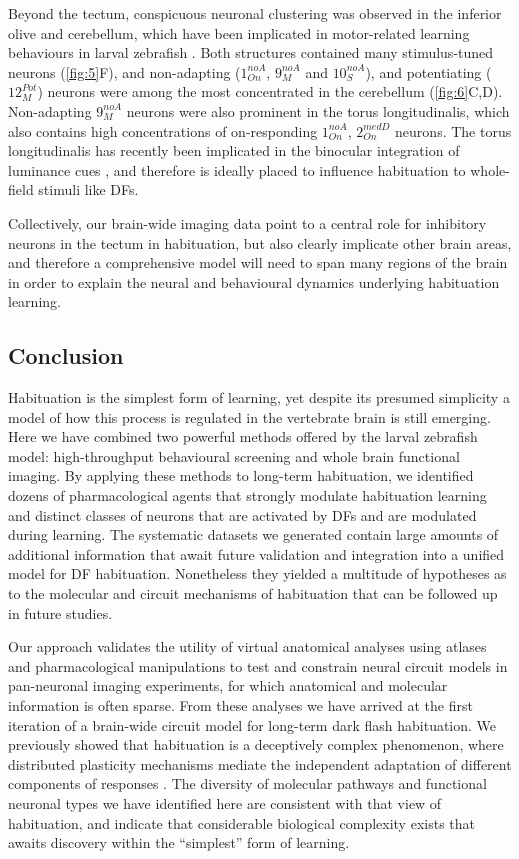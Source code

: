 \documentclass[9pt,lineno]{RandlettLab_elife}
\begin{document}
Beyond the tectum, conspicuous neuronal clustering was observed in the inferior olive and cerebellum, which have been implicated in motor-related learning behaviours in larval zebrafish \cite{Ahrens2012-zb, Lin2020-dv, Markov2021-rc}. Both structures contained many stimulus-tuned neurons (\autoref{fig:5}F), and non-adapting ($1_{On}^{noA}$,  $9_{M}^{noA}$ and $10_{S}^{noA}$), and potentiating ($12_{M}^{Pot}$) neurons were among the most concentrated in the cerebellum (\autoref{fig:6}C,D). Non-adapting $9_{M}^{noA}$ neurons were also prominent in the torus longitudinalis, which also contains high concentrations of on-responding $1_{On}^{noA}$, $2_{On}^{medD}$ neurons. The torus longitudinalis has recently been implicated in the binocular integration of luminance cues \cite{Tesmer2022-tk}, and therefore is ideally placed to influence habituation to whole-field stimuli like DFs. 

Collectively, our brain-wide imaging data point to a central role for inhibitory neurons in the tectum in habituation, but also clearly implicate other brain areas, and therefore a comprehensive model will need to span many regions of the brain in order to explain the neural and behavioural dynamics underlying habituation learning. 

\subsection{Conclusion}

Habituation is the simplest form of learning, yet despite its presumed simplicity a model of how this process is regulated in the vertebrate brain is still emerging. Here we have combined two powerful methods offered by the larval zebrafish model: high-throughput behavioural screening and whole brain functional imaging. By applying these methods to long-term habituation, we identified dozens of pharmacological agents that strongly modulate habituation learning and distinct classes of neurons that are activated by DFs and are modulated during learning. The systematic datasets we generated contain large amounts of additional information that await future validation and integration into a unified model for DF habituation. Nonetheless they yielded a multitude of hypotheses as to the molecular and circuit mechanisms of habituation that can be followed up in future studies. 

Our approach validates the utility of virtual anatomical analyses using atlases and pharmacological manipulations to test and constrain neural circuit models in pan-neuronal imaging experiments, for which anatomical and molecular information is often sparse. From these analyses we have arrived at the first iteration of a brain-wide circuit model for long-term dark flash habituation. We previously showed that habituation is a deceptively complex phenomenon, where distributed plasticity mechanisms mediate the independent adaptation of different components of responses \cite{Randlett2019-fi}. The diversity of molecular pathways and functional neuronal types we have identified here are consistent with that view of habituation, and indicate that considerable biological complexity exists that awaits discovery within the “simplest” form of learning. 
\end{document}
